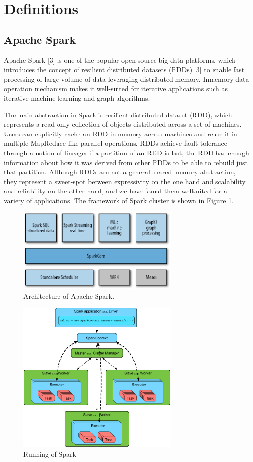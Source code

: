 \section{Definitions}\label{sec:definition}
\subsection{Apache Spark}
\par  Apache Spark [3] is one of the popular open-source big
data platforms, which introduces the concept of resilient
distributed datasets (RDDs) [3] to enable fast processing of
large volume of data leveraging distributed memory. Inmemory
data operation mechanism makes it well-suited for
iterative applications such as iterative machine learning and
graph algorithms.
\par The main abstraction in Spark is resilient distributed
dataset (RDD), which represents a read-only collection of
objects distributed across a set of machines. Users can
explicitly cache an RDD in memory across machines and
reuse it in multiple MapReduce-like parallel operations. RDDs
achieve fault tolerance through a notion of lineage: if a
partition of an RDD is lost, the RDD has enough information
about how it was derived from other RDDs to be able to
rebuild just that partition. Although RDDs are not a general
shared memory abstraction, they represent a sweet-spot
between expressivity on the one hand and scalability and
reliability on the other hand, and we have found them wellsuited
for a variety of applications. The framework of Spark
cluster is shown in Figure 1.
\par
\begin{figure}[h]
	\includegraphics[width=8cm]{1.eps}
	\caption{Architecture of Apache Spark.}\label{fig:ArchitectureSpark}
\end{figure}




\begin{figure}
	\includegraphics[width=8cm]{4.eps}
	\caption{Running of Spark}\label{fig:RunningSpark}
\end{figure}

